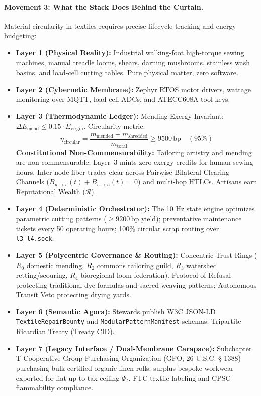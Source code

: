 \paragraph{Movement 3: What the Stack Does Behind the Curtain.}
Material circularity in textiles requires precise lifecycle tracking and energy budgeting:
\begin{itemize}
    \item \textbf{Layer 1 (Physical Reality):} Industrial walking-foot high-torque sewing machines, manual treadle looms, shears, darning mushrooms, stainless wash basins, and load-cell cutting tables. Pure physical matter, zero software.
    \item \textbf{Layer 2 (Cybernetic Membrane):} Zephyr RTOS motor drivers, wattage monitoring over MQTT, load-cell ADCs, and ATECC608A tool keys.
    \item \textbf{Layer 3 (Thermodynamic Ledger):} Mending Exergy Invariant: $\Delta E_{\mathrm{mend}} \le 0.15 \cdot E_{\mathrm{virgin}}$. Circularity metric:
    \[
    \eta_{\mathrm{circular}} = \frac{m_{\mathrm{mended}} + m_{\mathrm{shredded}}}{m_{\mathrm{total}}} \ge 9500\,\mathrm{bp} \quad (95\%)
    \]
    \textbf{Constitutional Non-Commensurability:} Tailoring artistry and mending are non-commensurable; Layer~3 mints zero exergy credits for human sewing hours. Inter-node fiber trades clear across Pairwise Bilateral Clearing Channels ($B_{u \to v}(t) + B_{v \to u}(t) = 0$) and multi-hop HTLCs. Artisans earn Reputational Wealth ($\mathcal{R}$).
    \item \textbf{Layer 4 (Deterministic Orchestrator):} The 10 Hz state engine optimizes parametric cutting patterns ($\ge 9200\,\mathrm{bp}$ yield); preventative maintenance tickets every 50 operating hours; 100\% circular scrap routing over \texttt{l3\_l4.sock}.
    \item \textbf{Layer 5 (Polycentric Governance \& Routing):} Concentric Trust Rings ($R_0$ domestic mending, $R_2$ commons tailoring guild, $R_3$ watershed retting/scouring, $R_4$ bioregional loom federation). Protocol of Refusal protecting traditional dye formulas and sacred weaving patterns; Autonomous Transit Veto protecting drying yards.
    \item \textbf{Layer 6 (Semantic Agora):} Stewards publish W3C JSON-LD \texttt{TextileRepairBounty} and \texttt{ModularPatternManifest} schemas. Tripartite Ricardian Treaty ($\mathrm{Treaty\_CID}$).
    \item \textbf{Layer 7 (Legacy Interface / Dual-Membrane Carapace):} Subchapter T Cooperative Group Purchasing Organization (GPO, 26 U.S.C. § 1388) purchasing bulk certified organic linen rolls; surplus bespoke workwear exported for fiat up to tax ceiling $\Phi_t$. FTC textile labeling and CPSC flammability compliance.
\end{itemize}

